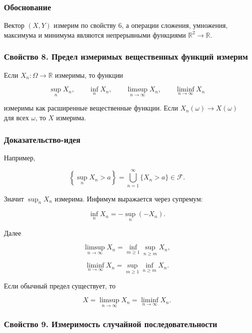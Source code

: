 \documentclass[
  11pt,
  a4paper,
]{article}
\begin{document}
\subsubsection{Обоснование}\label{ux43eux431ux43eux441ux43dux43eux432ux430ux43dux438ux435}

Вектор \((X,Y)\) измерим по свойству 6, а операции сложения, умножения,
максимума и минимума являются непрерывными функциями
\(\mathbb R^2\to\mathbb R\).

\subsubsection{Свойство 8. Предел измеримых вещественных функций
измерим}\label{ux441ux432ux43eux439ux441ux442ux432ux43e-8.-ux43fux440ux435ux434ux435ux43b-ux438ux437ux43cux435ux440ux438ux43cux44bux445-ux432ux435ux449ux435ux441ux442ux432ux435ux43dux43dux44bux445-ux444ux443ux43dux43aux446ux438ux439-ux438ux437ux43cux435ux440ux438ux43c}

Если \(X_n:\Omega\to\mathbb R\) измеримы, то функции

\[
\sup_n X_n,\qquad \inf_n X_n,\qquad \limsup_{n\to\infty}X_n,\qquad \liminf_{n\to\infty}X_n
\]

измеримы как расширенные вещественные функции. Если
\(X_n(\omega)\to X(\omega)\) для всех \(\omega\), то \(X\) измерима.

\subsubsection{Доказательство-идея}\label{ux434ux43eux43aux430ux437ux430ux442ux435ux43bux44cux441ux442ux432ux43e-ux438ux434ux435ux44f-1}

Например,

\[
\left\{\sup_n X_n>a\right\}
=
\bigcup_{n=1}^{\infty}\{X_n>a\}\in\mathcal F.
\]

Значит \(\sup_nX_n\) измерима. Инфимум выражается через супремум:

\[
\inf_nX_n=-\sup_n(-X_n).
\]

Далее

\[
\limsup_{n\to\infty}X_n=\inf_{m\ge1}\sup_{n\ge m}X_n,
\]

\[
\liminf_{n\to\infty}X_n=\sup_{m\ge1}\inf_{n\ge m}X_n.
\]

Если обычный предел существует, то

\[
X=\limsup_{n\to\infty}X_n=\liminf_{n\to\infty}X_n.
\]

\subsubsection{Свойство 9. Измеримость случайной
последовательности}\label{ux441ux432ux43eux439ux441ux442ux432ux43e-9.-ux438ux437ux43cux435ux440ux438ux43cux43eux441ux442ux44c-ux441ux43bux443ux447ux430ux439ux43dux43eux439-ux43fux43eux441ux43bux435ux434ux43eux432ux430ux442ux435ux43bux44cux43dux43eux441ux442ux438}
\end{document}
